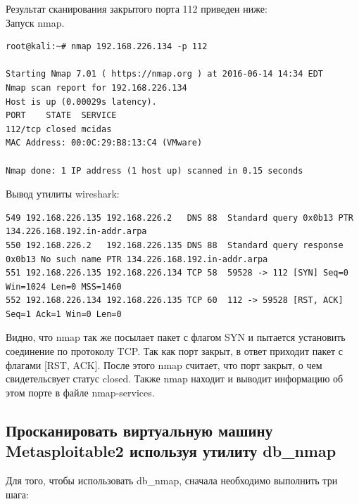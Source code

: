 \documentclass[10pt,a4paper,titlepage]{article}
\begin{document}
Результат сканирования закрытого порта 112 приведен ниже:\\

Запуск nmap.
\begin{verbatim}
root@kali:~# nmap 192.168.226.134 -p 112

Starting Nmap 7.01 ( https://nmap.org ) at 2016-06-14 14:34 EDT
Nmap scan report for 192.168.226.134
Host is up (0.00029s latency).
PORT    STATE  SERVICE
112/tcp closed mcidas
MAC Address: 00:0C:29:B8:13:C4 (VMware)

Nmap done: 1 IP address (1 host up) scanned in 0.15 seconds
\end{verbatim}

Вывод утилиты wireshark:

\begin{verbatim}
549	192.168.226.135	192.168.226.2	DNS	88	Standard query 0x0b13 PTR 134.226.168.192.in-addr.arpa
550	192.168.226.2	192.168.226.135	DNS	88	Standard query response 0x0b13 No such name PTR 134.226.168.192.in-addr.arpa
551	192.168.226.135	192.168.226.134	TCP	58	59528 -> 112 [SYN] Seq=0 Win=1024 Len=0 MSS=1460
552	192.168.226.134	192.168.226.135	TCP	60	112 -> 59528 [RST, ACK] Seq=1 Ack=1 Win=0 Len=0
\end{verbatim}

Видно, что nmap так же посылает пакет с флагом SYN и пытается установить соединение по протоколу TCP. Так как порт закрыт, в ответ приходит пакет с флагами [RST, ACK]. После этого nmap считает, что порт закрыт, о чем свидетельсвует статус closed. Также nmap находит и выводит информацию об этом порте в файле nmap-services.

\subsection{Просканировать виртуальную машину Metasploitable2 используя утилиту db\_nmap}
Для того, чтобы использовать db\_nmap, сначала необходимо выполнить три шага:
\end{document}
